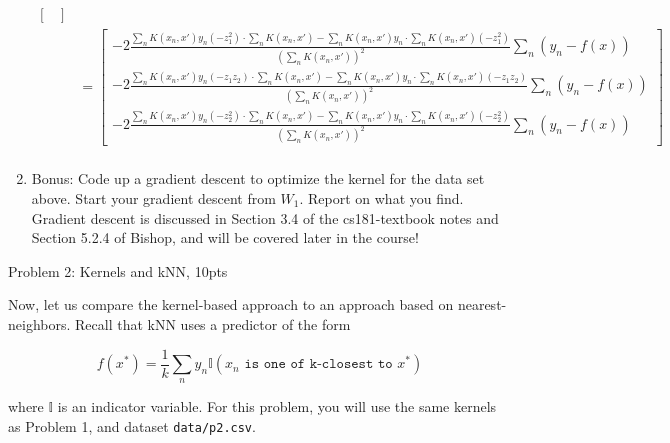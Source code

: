 \documentclass[submit]{harvardml}
\begin{document}
\begin{enumerate}
\begin{equation}
\begin{split}
\begin{bmatrix}
        \end{bmatrix}\\
        &= \begin{bmatrix}-2 \frac {\sum_{n} K (x_n, x')y_n(-z_1^2) \cdot \sum_n K (x_n,x') - \sum_{n} K (x_n, x')y_n \cdot \sum_{n} K (x_n, x')(-z_1^2)}{(\sum_{n} K (x_n, x'))^2}\sum_{n} (y_n - f(x) )\\
        -2 \frac {\sum_{n} K (x_n, x')y_n(-z_1z_2) \cdot \sum_n K (x_n,x') - \sum_{n} K (x_n, x')y_n \cdot \sum_{n} K (x_n, x')(-z_1z_2)}{(\sum_{n} K (x_n, x'))^2}\sum_{n} (y_n - f(x) )\\
        -2 \frac {\sum_{n} K (x_n, x')y_n(-z_2^2) \cdot \sum_n K (x_n,x') - \sum_{n} K (x_n, x')y_n \cdot \sum_{n} K (x_n, x')(-z_2^2)}{(\sum_{n} K (x_n, x'))^2}\sum_{n} (y_n - f(x) )\end{bmatrix}\\
  \end{split}
  \end{equation}

\item Bonus:  Code up a gradient descent to
  optimize the kernel for the data set above.  Start your gradient
  descent from $W_1$.  Report on what you find.\\
  Gradient descent is discussed in Section 3.4 of the cs181-textbook notes and Section 5.2.4 of Bishop, and will be covered later in the course! 

\end{enumerate}



\newpage


Problem 2: Kernels and kNN, 10pts

Now, let us compare the kernel-based approach to an approach based on
nearest-neighbors.  Recall that kNN uses a predictor of the form

  \begin{equation*}
    f(x^*) = \frac{1}{k} \sum_n y_n \mathbb{I}(x_n \texttt{ is one of k-closest to } x^*)
  \end{equation*}

 where $\mathbb{I}$ is an indicator variable. For this problem, you will use the same kernels as Problem 1, and dataset \verb|data/p2.csv|.
\end{document}
